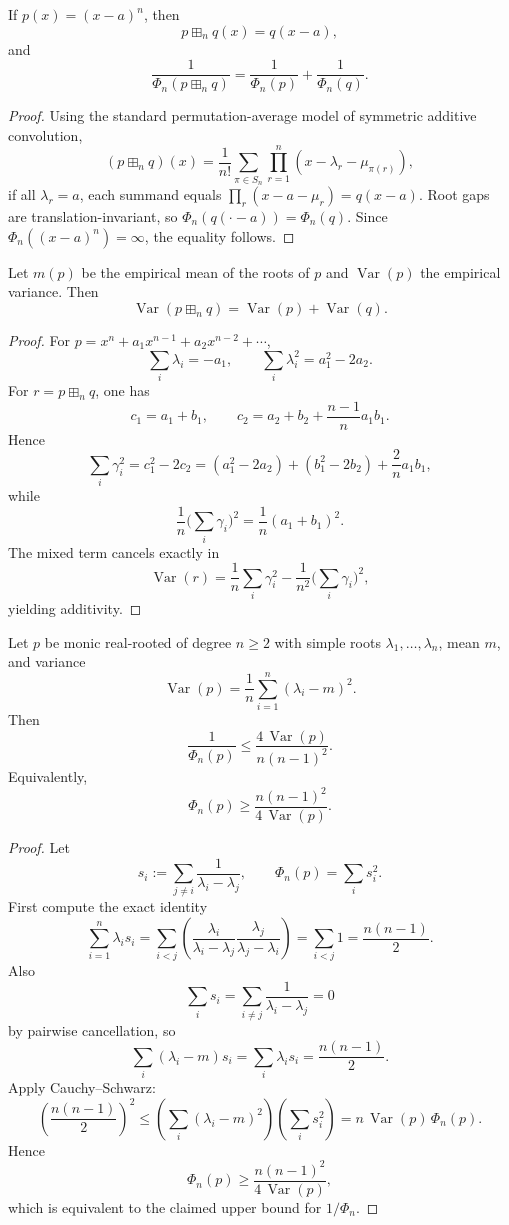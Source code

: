 \begin{proposition}\label{prop:q4-shift}
If $p(x)=(x-a)^n$, then
\[
p\boxplus_n q(x)=q(x-a),
\]
and
\[
\frac{1}{\Phi_n(p\boxplus_n q)}=\frac{1}{\Phi_n(p)}+\frac{1}{\Phi_n(q)}.
\]
\end{proposition}

\begin{proof}
Using the standard permutation-average model of symmetric additive convolution,
\[
(p\boxplus_n q)(x)=\frac1{n!}\sum_{\pi\in S_n}\prod_{r=1}^n(x-\lambda_r-\mu_{\pi(r)}),
\]
if all $\lambda_r=a$, each summand equals $\prod_r(x-a-\mu_r)=q(x-a)$. Root gaps are translation-invariant, so
$\Phi_n(q(\cdot-a))=\Phi_n(q)$. Since $\Phi_n((x-a)^n)=\infty$, the equality follows.
\end{proof}

\begin{proposition}\label{prop:q4-var}
Let $m(p)$ be the empirical mean of the roots of $p$ and $\operatorname{Var}(p)$ the empirical variance. Then
\[
\operatorname{Var}(p\boxplus_n q)=\operatorname{Var}(p)+\operatorname{Var}(q).
\]
\end{proposition}

\begin{proof}
For $p=x^n+a_1x^{n-1}+a_2x^{n-2}+\cdots$,
\[
\sum_i\lambda_i=-a_1,\qquad \sum_i\lambda_i^2=a_1^2-2a_2.
\]
For $r=p\boxplus_n q$, one has
\[
c_1=a_1+b_1,\qquad c_2=a_2+b_2+\frac{n-1}{n}a_1b_1.
\]
Hence
\[
\sum_i\gamma_i^2=c_1^2-2c_2=(a_1^2-2a_2)+(b_1^2-2b_2)+\frac{2}{n}a_1b_1,
\]
while
\[
\frac1n\Big(\sum_i\gamma_i\Big)^2=\frac1n(a_1+b_1)^2.
\]
The mixed term cancels exactly in
\[
\operatorname{Var}(r)=\frac1n\sum_i\gamma_i^2-\frac1{n^2}\Big(\sum_i\gamma_i\Big)^2,
\]
yielding additivity.
\end{proof}

\begin{proposition}\label{prop:q4-N-var-upper}
Let $p$ be monic real-rooted of degree $n\ge 2$ with simple roots
$\lambda_1,\dots,\lambda_n$, mean $m$, and variance
\[
\operatorname{Var}(p)=\frac1n\sum_{i=1}^n(\lambda_i-m)^2.
\]
Then
\[
\frac1{\Phi_n(p)}
\le
\frac{4\,\operatorname{Var}(p)}{n(n-1)^2}.
\]
Equivalently,
\[
\Phi_n(p)\ge \frac{n(n-1)^2}{4\,\operatorname{Var}(p)}.
\]
\end{proposition}

\begin{proof}
Let
\[
s_i:=\sum_{j\ne i}\frac1{\lambda_i-\lambda_j},
\qquad
\Phi_n(p)=\sum_i s_i^2.
\]
First compute the exact identity
\[
\sum_{i=1}^n \lambda_i s_i
=
\sum_{i<j}\left(
\frac{\lambda_i}{\lambda_i-\lambda_j}
\frac{\lambda_j}{\lambda_j-\lambda_i}
\right)
=
\sum_{i<j}1
=
\frac{n(n-1)}2.
\]
Also
\[
\sum_i s_i
=
\sum_{i\ne j}\frac1{\lambda_i-\lambda_j}
=0
\]
by pairwise cancellation, so
\[
\sum_i (\lambda_i-m)s_i=\sum_i \lambda_i s_i=\frac{n(n-1)}2.
\]
Apply Cauchy--Schwarz:
\[
\left(\frac{n(n-1)}2\right)^2
\le
\left(\sum_i (\lambda_i-m)^2\right)\left(\sum_i s_i^2\right)
=
n\,\operatorname{Var}(p)\,\Phi_n(p).
\]
Hence
\[
\Phi_n(p)\ge \frac{n(n-1)^2}{4\,\operatorname{Var}(p)},
\]
which is equivalent to the claimed upper bound for $1/\Phi_n$.
\end{proof}

